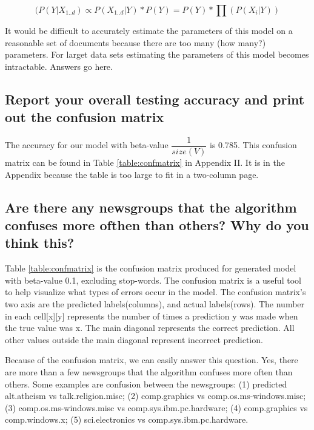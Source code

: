 \documentclass{IEEEtran}
\begin{document}
\begin{equation}
\label{entropy-equation}
(P(Y|X_{1..d}) \propto P(X_{1..d}|Y)*P(Y) = P(Y)*\prod(P(X_i|Y))
\end{equation}

It would be difficult to accurately estimate the parameters of this model on a reasonable set of documents because there are too many (how many?) parameters. For larget data sets estimating the parameters of this model becomes intractable.
Answers go here.


\subsection{Report your overall testing accuracy and print out the confusion matrix}
The accuracy for our model with beta-value $\dfrac{1}{size(V)}$ is 0.785. This confusion matrix can be found in Table \ref{table:confmatrix} in Appendix II. It is in the Appendix because the table is too large to fit in a two-column page.


\subsection{Are there any newsgroups that the algorithm confuses more ofthen than others? Why do you think this?}

Table \ref{table:confmatrix} is the confusion matrix produced for generated model with beta-value 0.1, excluding stop-words. The confusion matrix is a useful tool to help visualize what types of errors occur in the model. The confusion matrix's two axis are the predicted labels(columns), and actual labels(rows). The number in each cell[x][y] represents the number of times a prediction y was made when the true value was x. The main diagonal represents the correct prediction. All other values outside the main diagonal represent incorrect prediction.

Because of the confusion matrix, we can easily answer this question. Yes, there are more than a few newsgroups that the algorithm confuses more often than others. Some examples are confusion between the newsgroups: (1) predicted alt.atheism vs talk.religion.misc; (2) comp.graphics vs comp.os.ms-windows.misc; (3) comp.os.ms-windows.misc vs comp.sys.ibm.pc.hardware; (4) comp.graphics vs comp.windows.x; (5) sci.electronics vs comp.sys.ibm.pc.hardware.
\end{document}
